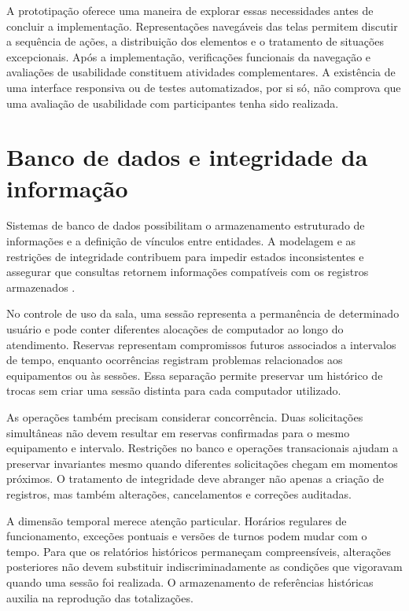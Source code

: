 A prototipação oferece uma maneira de explorar essas necessidades antes de concluir a implementação. Representações navegáveis das telas permitem discutir a sequência de ações, a distribuição dos elementos e o tratamento de situações excepcionais. Após a implementação, verificações funcionais da navegação e avaliações de usabilidade constituem atividades complementares. A existência de uma interface responsiva ou de testes automatizados, por si só, não comprova que uma avaliação de usabilidade com participantes tenha sido realizada.

\section{Banco de dados e integridade da informação}\label{sec:banco}

Sistemas de banco de dados possibilitam o armazenamento estruturado de informações e a definição de vínculos entre entidades. A modelagem e as restrições de integridade contribuem para impedir estados inconsistentes e assegurar que consultas retornem informações compatíveis com os registros armazenados \cite{silberschatz2019}.

No controle de uso da sala, uma sessão representa a permanência de determinado usuário e pode conter diferentes alocações de computador ao longo do atendimento. Reservas representam compromissos futuros associados a intervalos de tempo, enquanto ocorrências registram problemas relacionados aos equipamentos ou às sessões. Essa separação permite preservar um histórico de trocas sem criar uma sessão distinta para cada computador utilizado.

As operações também precisam considerar concorrência. Duas solicitações simultâneas não devem resultar em reservas confirmadas para o mesmo equipamento e intervalo. Restrições no banco e operações transacionais ajudam a preservar invariantes mesmo quando diferentes solicitações chegam em momentos próximos. O tratamento de integridade deve abranger não apenas a criação de registros, mas também alterações, cancelamentos e correções auditadas.

A dimensão temporal merece atenção particular. Horários regulares de funcionamento, exceções pontuais e versões de turnos podem mudar com o tempo. Para que os relatórios históricos permaneçam compreensíveis, alterações posteriores não devem substituir indiscriminadamente as condições que vigoravam quando uma sessão foi realizada. O armazenamento de referências históricas auxilia na reprodução das totalizações.

